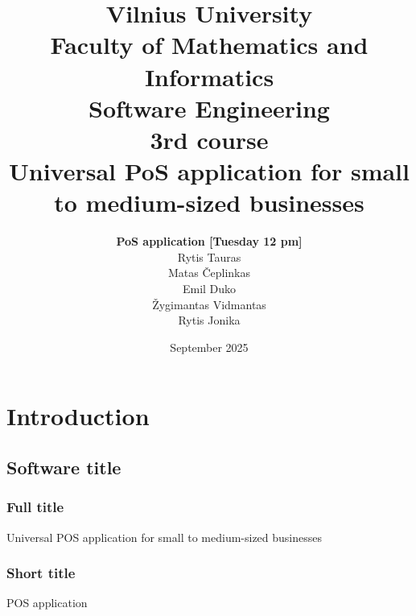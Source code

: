 \documentclass{article}
\title{Vilnius University\\Faculty of Mathematics and Informatics\\Software Engineering\\3rd course\\[1cm] \Huge Universal PoS application for small to medium-sized businesses\\[1cm]}
\author{\textbf{PoS application [Tuesday 12 pm]}\\[0.25cm]Rytis Tauras\\Matas Čeplinkas\\Emil Duko\\Žygimantas Vidmantas\\Rytis Jonika\\[4cm]}
\date{September 2025}
\begin{document}
\maketitle

\newpage
\setcounter{tocdepth}{3}
\tableofcontents
\newpage

\section{Introduction}
\subsection{Software title}
\subsubsection{Full title} Universal POS application for small to medium-sized businesses
\subsubsection{Short title} POS application
\end{document}
